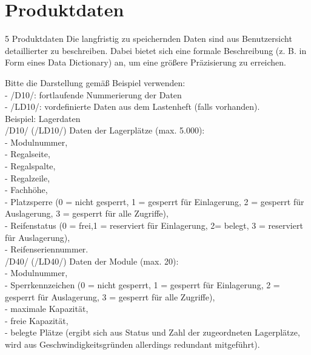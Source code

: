 
\chapter{Produktdaten}
5  Produktdaten
Die langfristig zu speichernden Daten sind aus Benutzersicht detaillierter zu
beschreiben. Dabei bietet sich eine formale Beschreibung (z. B. in Form eines
Data Dictionary) an, um eine größere Präzisierung zu erreichen.

Bitte die Darstellung gemäß Beispiel verwenden:\\
-  /D10/: fortlaufende Nummerierung der Daten\\
-  /LD10/: vordefinierte Daten aus dem Lastenheft (falls vorhanden).\\

Beispiel: Lagerdaten\\
/D10/ (/LD10/) Daten der Lagerplätze (max. 5.000):\\
-  Modulnummer,\\
-  Regalseite,\\
-  Regalspalte,\\
-  Regalzeile,\\
-  Fachhöhe,\\
-  Platzsperre (0 = nicht gesperrt, 1 = gesperrt für Einlagerung, 2 = gesperrt
   für Auslagerung, 3 = gesperrt für alle Zugriffe),\\
-  Reifenstatus (0 = frei,1 = reserviert für Einlagerung, 2= belegt, 3 =
   reserviert für Auslagerung),\\
-  Reifenseriennummer.\\

/D40/ (/LD40/) Daten der Module (max. 20):\\
-  Modulnummer,\\
-  Sperrkennzeichen (0 = nicht gesperrt, 1 = gesperrt für Einlagerung, 2 =
   gesperrt für Auslagerung, 3 = gesperrt für alle Zugriffe),\\
-  maximale Kapazität,\\
-  freie Kapazität,\\
-  belegte Plätze (ergibt sich aus Status und Zahl der zugeordneten
   Lagerplätze, wird aus Geschwindigkeitsgründen allerdings redundant
   mitgeführt).

